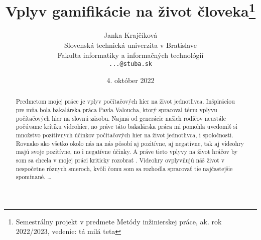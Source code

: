 \documentclass[10pt,twoside,slovak,coursepaper]{article}
\title{Vplyv gamifikácie na život človeka\thanks{Semestrálny projekt v predmete Metódy inžinierskej práce, ak. rok 2022/2023, vedenie: tá milá teta}}
\author{Janka Krajčíková\\[2pt]
	{\small Slovenská technická univerzita v Bratislave}\\
	{\small Fakulta informatiky a informačných technológií}\\
	{\small \texttt{...@stuba.sk}}
	}
\date{\small 4. október 2022}
\begin{document}
\maketitle

\begin{abstract}
Predmetom mojej práce je vplyv počítačových hier na život jednotlivca. Inšpiráciou pre mňa bola bakalárska práca Pavla Valoucha, ktorý spracoval tému vplyvu počítačových hier na slovnú zásobu. Najmä od generácie našich rodičov neustále počúvame kritiku videohier, no práve táto bakalárska práca mi pomohla uvedomiť si množstvo pozitívnych účinkov počítačových hier na život jednotlivca, i spoločnosti. Rovnako ako všetko okolo nás na nás pôsobí aj pozitívne, aj negatívne, tak aj videohry majú svoje pozitívne, no i negatívne účinky. A práve tieto vplyvy na život hráčov by som sa chcela v mojej práci kriticky rozobrať . Videohry ovplyvňujú náš život v nespočetne rôznych smeroch, kvôli čomu som sa rozhodla spracovať tie najčastejšie spomínané. 
\ldots
\end{abstract}

\section{}
\end{document}
